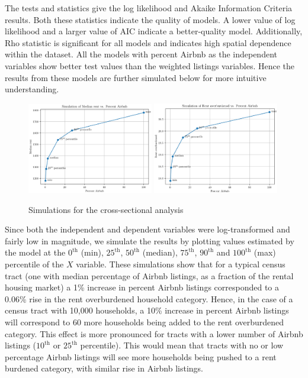\documentclass[10pt,letterpaper,onecolumn]{article}
\begin{document}
The tests and statistics give the log likelihood and Akaike Information
Criteria results. Both these statistics indicate the quality of models.
A lower value of log likelihood and a larger value of AIC indicate a
better-quality model. Additionally, Rho statistic is significant for all
models and indicates high spatial dependence within the dataset. All the
models with percent Airbnb as the independent variables show better test
values than the weighted listings variables. Hence the results from
these models are further simulated below for more intuitive
understanding.

\begin{figure}
  \centering
  \includegraphics[width=0.49\textwidth]{Median_rent_vs_Percent_Airbnb.png}
  \includegraphics[width=0.49\textwidth]{Rent_overburdened_vs_Percent_Airbnb.png}
  \caption{Simulations for the cross-sectional analysis}
\end{figure}

Since both the independent and dependent variables were log-transformed
and fairly low in magnitude, we simulate the results by plotting values
estimated by the model at the \(0^\text{th}\) (min), \(25^\text{th}\), \(50^\text{th}\) (median), \(75^\text{th}\), \(90^\text{th}\)
and \(100^\text{th}\) (max) percentile of the \(X\) variable. These simulations show
that for a typical census tract (one with median percentage of Airbnb
listings, as a fraction of the rental housing market) a 1\% increase in
percent Airbnb listings corresponded to a 0.06\% rise in the rent
overburdened household category. Hence, in the case of a census tract
with 10,000 households, a 10\% increase in percent Airbnb listings will
correspond to 60 more households being added to the rent overburdened
category. This effect is more pronounced for tracts with a lower number
of Airbnb listings (\(10^\text{th}\) or \(25^\text{th}\) percentile). This would mean that
tracts with no or low percentage Airbnb listings will see more
households being pushed to a rent burdened category, with similar rise
in Airbnb listings.
\end{document}
